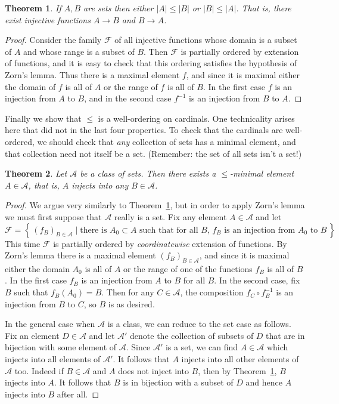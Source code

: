 \documentclass[11pt,oneside]{amsbook}
\newcommand{\set}[1]{\left\{\,#1\,\right\}}
\theoremstyle{definition}
\theoremstyle{plain}
\newtheorem{theorem}{Theorem}[section]
\theoremstyle{definition}
\theoremstyle{remark}
\numberwithin{equation}{section}
\numberwithin{figure}{section}
\begin{document}
\begin{theorem}
  \label{thm:card-total}
  If $A,B$ are sets then either $|A|\leq|B|$ or $|B|\leq|A|$. That is, there exist injective functions $A\to B$ and $B\to A$.
\end{theorem}

\begin{proof}
  Consider the family $\mathcal F$ of all injective functions whose domain is a subset of $A$ and whose range is a subset of $B$. Then $\mathcal F$ is partially ordered by extension of functions, and it is easy to check that this ordering satisfies the hypothesis of Zorn's lemma. Thus there is a maximal element $f$, and since it is maximal either the domain of $f$ is all of $A$ or the range of $f$ is all of $B$. In the first case $f$ is an injection from $A$ to $B$, and in the second case $f^{-1}$ is an injection from $B$ to $A$.
\end{proof}

Finally we show that $\leq$ is a well-ordering on cardinals. One technicality arises here that did not in the last four properties. To check that the cardinals are well-ordered, we should check that \emph{any} collection of sets has a minimal element, and that collection need not itself be a set. (Remember: the set of all sets isn't a set!)

\begin{theorem}
  \label{thm:card-well}
  Let $\mathcal A$ be a class of sets. Then there exists a $\leq$-minimal element $A\in\mathcal A$, that is, $A$ injects into any $B\in\mathcal A$.
\end{theorem}

\begin{proof}
  We argue very similarly to Theorem~\ref{thm:card-total}, but in order to apply Zorn's lemma we must first suppose that $\mathcal A$ really is a set. Fix any element $A\in\mathcal A$ and let
  \[\mathcal F=\set{(f_B)_{B\in\mathcal A}\mid\text{there is $A_0\subset A$ such that for all $B$, $f_B$ is an injection from $A_0$ to $B$}}
  \]
  This time $\mathcal F$ is partially ordered by \emph{coordinatewise} extension of functions. By Zorn's lemma there is a maximal element $(f_B)_{B\in\mathcal A}$, and since it is maximal either the domain $A_0$ is all of $A$ or the range of one of the functions $f_B$ is all of $B$. In the first case $f_B$ is an injection from $A$ to $B$ for all $B$. In the second case, fix $B$ such that $f_B(A_0)=B$. Then for any $C\in\mathcal A$, the composition $f_C\circ f_B^{-1}$ is an injection from $B$ to $C$, so $B$ is as desired.

  In the general case when $\mathcal A$ is a class, we can reduce to the set case as follows. Fix an element $D\in\mathcal A$ and let $\mathcal A'$ denote the collection of subsets of $D$ that are in bijection with some element of $\mathcal A$. Since $\mathcal A'$ is a set, we can find $A\in\mathcal A$ which injects into all elements of $\mathcal A'$. It follows that $A$ injects into all other elements of $\mathcal A$ too. Indeed if $B\in\mathcal A$ and $A$ does not inject into $B$, then by Theorem~\ref{thm:card-total}, $B$ injects into $A$. It follows that $B$ is in bijection with a subset of $D$ and hence $A$ injects into $B$ after all.
\end{proof}
\end{document}
